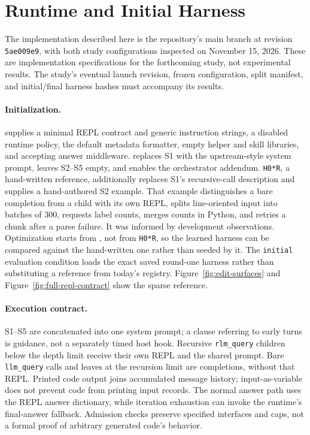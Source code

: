 \section{Runtime and Initial Harness}
\label{app:surfaces}

The implementation described here is the repository's main branch at revision
\texttt{5ae009e9}, with both study configurations inspected on November 15,
2026. These are implementation specifications for the forthcoming
study, not experimental results. The study's eventual launch revision, frozen
configuration, split manifest, and initial/final harness hashes must accompany
its results.

\paragraph{Initialization.}
\hzero{} supplies a minimal REPL contract and generic instruction strings, a
disabled runtime policy, the default metadata formatter, empty helper and skill
libraries, and accepting answer middleware. \hzerostar{} replaces S1 with the
upstream-style system prompt, leaves S2--S5 empty, and enables the orchestrator
addendum. \texttt{H0*R}, a hand-written reference, additionally replaces
S1's recursive-call description and supplies a hand-authored S2 example. That
example distinguishes a bare completion from a child with its own REPL, splits
line-oriented input into batches of 300, requests label counts, merges counts in
Python, and retries a chunk after a parse failure. It was informed by development
observations. Optimization starts from \hzero{}, not from \texttt{H0*R}, so the
learned harness can be compared against the hand-written one rather than seeded
by it. The \texttt{initial} evaluation condition loads the exact
saved round-one harness rather than substituting a reference from today's
registry. Figure~\ref{fig:edit-surfaces} and Figure~\ref{fig:full-repl-contract}
show the sparse \hzero{} reference.

\paragraph{Execution contract.}
S1--S5 are concatenated into one system prompt; a clause referring to early turns
is guidance, not a separately timed host hook. Recursive \texttt{rlm\_query}
children below the depth limit receive their own REPL and the shared prompt.
Bare \texttt{llm\_query} calls and leaves at the recursion limit are completions,
without that REPL. Printed code output joins accumulated message history;
input-as-variable does not prevent code from printing input records. The normal
answer path uses the REPL answer dictionary, while iteration exhaustion can
invoke the runtime's final-answer fallback. Admission checks preserve specified
interfaces and caps, not a formal proof of arbitrary generated code's behavior.

